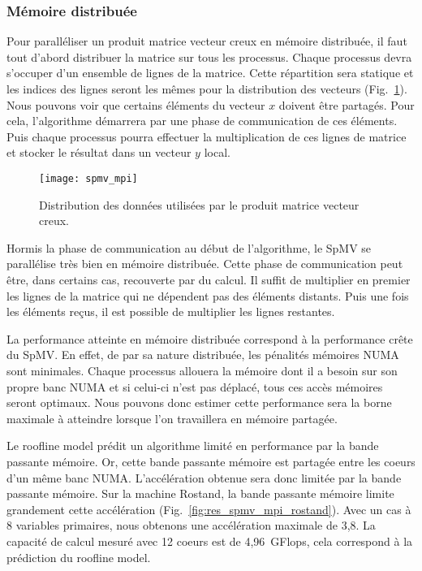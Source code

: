 \subsubsection{Mémoire distribuée}
Pour paralléliser un produit matrice vecteur creux en mémoire distribuée, il faut tout d'abord distribuer la matrice sur tous les processus.
%
Chaque processus devra s'occuper d'un ensemble de lignes de la matrice.
%
Cette répartition sera statique et les indices des lignes seront les mêmes pour la distribution des vecteurs (Fig.~\ref{fig:spmv_mpi}).
%
Nous pouvons voir que certains éléments du vecteur $x$ doivent être partagés.
%
Pour cela, l'algorithme démarrera par une phase de communication de ces éléments.
%
Puis chaque processus pourra effectuer la multiplication de ces lignes de matrice et stocker le résultat dans un vecteur $y$ local.
\begin{figure}
  \centering
  \texttt{[image: spmv\_mpi]}
  \caption{Distribution des données utilisées par le produit matrice vecteur creux.}
  \label{fig:spmv_mpi}
\end{figure}
Hormis la phase de communication au début de l'algorithme, le SpMV se parallélise très bien en mémoire distribuée.
%
Cette phase de communication peut être, dans certains cas, recouverte par du calcul.
%
Il suffit de multiplier en premier les lignes de la matrice qui ne dépendent pas des éléments distants.
%
Puis une fois les éléments reçus, il est possible de multiplier les lignes restantes.

La performance atteinte en mémoire distribuée correspond à la performance crête du SpMV.
%
En effet, de par sa nature distribuée, les pénalités mémoires NUMA sont minimales.
%
Chaque processus allouera la mémoire dont il a besoin sur son propre banc NUMA et si celui-ci n'est pas déplacé, tous ces accès mémoires seront optimaux.
%
Nous pouvons donc estimer cette performance sera la borne maximale à atteindre lorsque l'on travaillera en mémoire partagée.


Le roofline model prédit un algorithme limité en performance par la bande passante mémoire.
%
Or, cette bande passante mémoire est partagée entre les coeurs d'un même banc NUMA.
%
L'accélération obtenue sera donc limitée par la bande passante mémoire.
%
Sur la machine Rostand, la bande passante mémoire limite grandement cette accélération (Fig.~\ref{fig:res_spmv_mpi_rostand}).
%
Avec un cas à 8 variables primaires, nous obtenons une accélération maximale de 3,8.
%
La capacité de calcul mesuré avec 12 coeurs est de 4,96~GFlops, cela correspond à la prédiction du roofline model.

